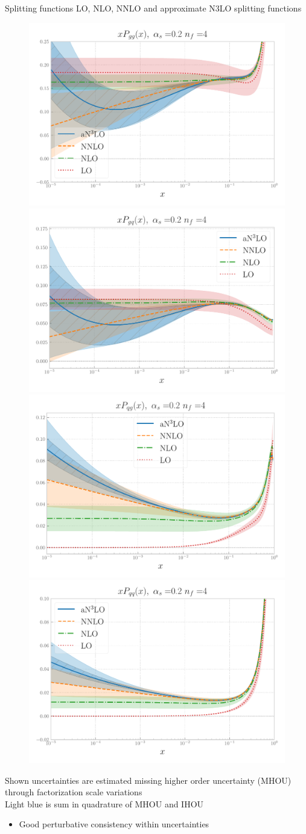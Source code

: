 \documentclass[aspectratio=169, 9pt,t]{beamer}
\begin{document}
\begin{frame}{Splitting functions}
  LO, NLO, NNLO and approximate N3LO splitting functions
  \begin{figure}
    \centering
    \includegraphics[width=.3\textwidth]{figures/gamma_gg_totu_logx.pdf}
    \includegraphics[width=.3\textwidth]{figures/gamma_gq_totu_logx.pdf} \\
    \includegraphics[width=.3\textwidth]{figures/gamma_qg_totu_logx.pdf}
    \includegraphics[width=.3\textwidth]{figures/gamma_qq_totu_logx.pdf}
  \end{figure}
  Shown uncertainties are estimated missing higher order uncertainty (MHOU) through factorization scale variations \\
  Light blue is sum in quadrature of MHOU and IHOU

  \begin{itemize}
    \item Good perturbative consistency within uncertainties
  \end{itemize}
\end{frame}
\end{document}
